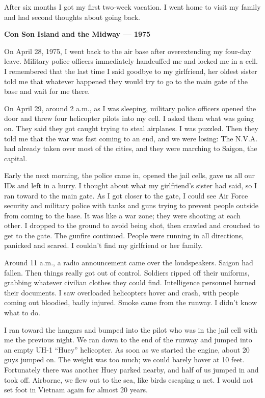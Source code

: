 After six months I got my first two-week vacation. I went home to visit
my family and had second thoughts about going back.

\textbf{Con Son Island and the Midway --- 1975}

On April 28, 1975, I went back to the air base after overextending my
four-day leave. Military police officers immediately handcuffed me and
locked me in a cell. I remembered that the last time I said goodbye to
my girlfriend, her oldest sister told me that whatever happened they
would try to go to the main gate of the base and wait for me there.

On April 29, around 2 a.m., as I was sleeping, military police officers
opened the door and threw four helicopter pilots into my cell. I asked
them what was going on. They said they got caught trying to steal
airplanes. I was puzzled. Then they told me that the war was fast coming
to an end, and we were losing: The N.V.A. had already taken over most of
the cities, and they were marching to Saigon, the capital.

Early the next morning, the police came in, opened the jail cells, gave
us all our IDs and left in a hurry. I thought about what my girlfriend's
sister had said, so I ran toward to the main gate. As I got closer to
the gate, I could see Air Force security and military police with tanks
and guns trying to prevent people outside from coming to the base. It
was like a war zone; they were shooting at each other. I dropped to the
ground to avoid being shot, then crawled and crouched to get to the
gate. The gunfire continued. People were running in all directions,
panicked and scared. I couldn't find my girlfriend or her family.

Around 11 a.m., a radio announcement came over the loudspeakers. Saigon
had fallen. Then things really got out of control. Soldiers ripped off
their uniforms, grabbing whatever civilian clothes they could find.
Intelligence personnel burned their documents. I saw overloaded
helicopters hover and crash, with people coming out bloodied, badly
injured. Smoke came from the runway. I didn't know what to do.

I ran toward the hangars and bumped into the pilot who was in the jail
cell with me the previous night. We ran down to the end of the runway
and jumped into an empty UH-1 ``Huey'' helicopter. As soon as we started
the engine, about 20 guys jumped on. The weight was too much; we could
barely hover at 10 feet. Fortunately there was another Huey parked
nearby, and half of us jumped in and took off. Airborne, we flew out to
the sea, like birds escaping a net. I would not set foot in Vietnam
again for almost 20 years.

